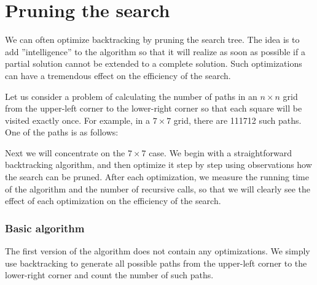 \section{Pruning the search}

We can often optimize backtracking
by pruning the search tree.
The idea is to add ''intelligence'' to the algorithm
so that it will realize as soon as possible
if a partial solution cannot be extended
to a complete solution.
Such optimizations can have a tremendous
effect on the efficiency of the search.

Let us consider a problem
of calculating the number of paths
in an $n \times n$ grid from the upper-left corner
to the lower-right corner so that each square
will be visited exactly once.
For example, in a $7 \times 7$ grid,
there are 111712 such paths.
One of the paths is as follows:

\begin{center}
\end{center}

Next we will concentrate on the $7 \times 7$ case.
We begin with a straightforward backtracking algorithm,
and then optimize it step by step using observations
how the search can be pruned.
After each optimization, we measure the running time
of the algorithm and the number of recursive calls,
so that we will clearly see the effect of each
optimization on the efficiency of the search.

\subsubsection{Basic algorithm}

The first version of the algorithm does not contain
any optimizations. We simply use backtracking to generate
all possible paths from the upper-left corner to
the lower-right corner and count the number of such paths.

